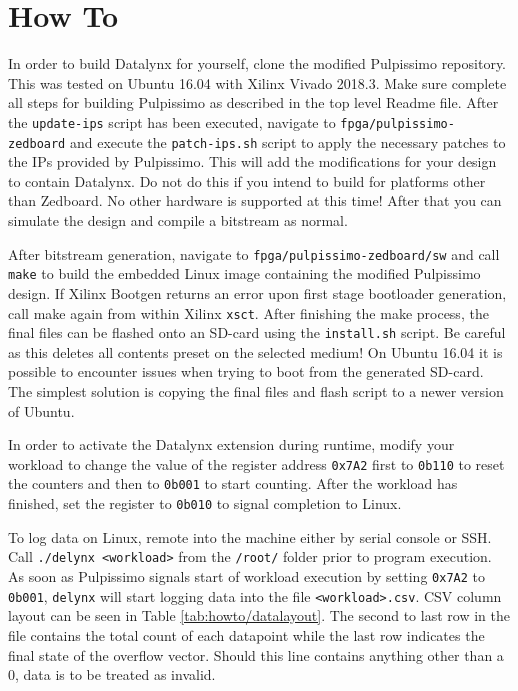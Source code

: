 \chapter{How To}
    \label{app:how_to}
    
In order to build Datalynx for yourself, clone the modified Pulpissimo repository. This was tested on Ubuntu 16.04 with Xilinx Vivado 2018.3. Make sure complete all steps for building Pulpissimo as described in the top level Readme file. After the \texttt{update-ips} script has been executed, navigate to \texttt{fpga/pulpissimo-zedboard} and execute the \texttt{patch-ips.sh} script to apply the necessary patches to the IPs provided by Pulpissimo. This will add the modifications for your design to contain Datalynx. Do not do this if you intend to build for platforms other than Zedboard. No other hardware is supported at this time! After that you can simulate the design and compile a bitstream as normal.

After bitstream generation, navigate to \texttt{fpga/pulpissimo-zedboard/sw} and call \texttt{make} to build the embedded Linux image containing the modified Pulpissimo design. If Xilinx Bootgen returns an error upon first stage bootloader generation, call make again from within Xilinx \texttt{xsct}. After finishing the make process, the final files can be flashed onto an SD-card using the \texttt{install.sh} script. Be careful as this deletes all contents preset on the selected medium! On Ubuntu 16.04 it is possible to encounter issues when trying to boot from the generated SD-card. The simplest solution is copying the final files and flash script to a newer version of Ubuntu.

In order to activate the Datalynx extension during runtime, modify your workload to change the value of the register address \texttt{0x7A2} first to \texttt{0b110} to reset the counters and then to \texttt{0b001} to start counting. After the workload has finished, set the register to \texttt{0b010} to signal completion to Linux. 

To log data on Linux, remote into the machine either by serial console or SSH. Call \texttt{./delynx <workload>} from the \texttt{/root/} folder prior to program execution. As soon as Pulpissimo signals start of workload execution by setting \texttt{0x7A2} to \texttt{0b001}, \texttt{delynx} will start logging data into the file \texttt{<workload>.csv}. CSV column layout can be seen in Table \ref{tab:howto/datalayout}. The second to last row in the file contains the total count of each datapoint while the last row indicates the final state of the overflow vector. Should this line contains anything other than a 0, data is to be treated as invalid.

